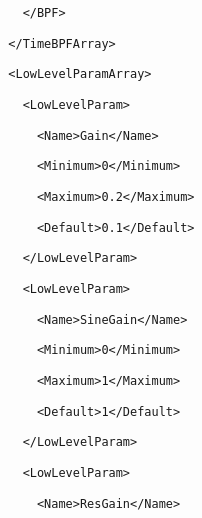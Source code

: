\documentclass[a4paper,english,american]{book}
\begin{document}
{\begin{spacing}{0.8}
{}
\par
\texttt{\footnotesize ~~~~</BPF>}{\footnotesize\par
}
\par
\texttt{\footnotesize ~~</TimeBPFArray>}{\footnotesize\par
}
\par
\texttt{\footnotesize ~~<LowLevelParamArray>}{\footnotesize\par
}
\par
\texttt{\footnotesize ~~~~<LowLevelParam>}{\footnotesize\par
}
\par
\texttt{\footnotesize ~~~~~~<Name>Gain</Name>}{\footnotesize\par
}
\par
\texttt{\footnotesize ~~~~~~<Minimum>0</Minimum>}{\footnotesize\par
}
\par
\texttt{\footnotesize ~~~~~~<Maximum>0.2</Maximum>}{\footnotesize\par
}
\par
\texttt{\footnotesize ~~~~~~<Default>0.1</Default>}{\footnotesize\par
}
\par
\texttt{\footnotesize ~~~~</LowLevelParam>}{\footnotesize\par
}
\par
\texttt{\footnotesize ~~~~<LowLevelParam>}{\footnotesize\par
}
\par
\texttt{\footnotesize ~~~~~~<Name>SineGain</Name>}{\footnotesize\par
}
\par
\texttt{\footnotesize ~~~~~~<Minimum>0</Minimum>}{\footnotesize\par
}
\par
\texttt{\footnotesize ~~~~~~<Maximum>1</Maximum>}{\footnotesize\par
}
\par
\texttt{\footnotesize ~~~~~~<Default>1</Default>}{\footnotesize\par
}
\par
\texttt{\footnotesize ~~~~</LowLevelParam>}{\footnotesize\par
}
\par
\texttt{\footnotesize ~~~~<LowLevelParam>}{\footnotesize\par
}
\par
\texttt{\footnotesize ~~~~~~<Name>ResGain</Name>}{\footnotesize\par
}
\par

\end{spacing}}
\end{document}
